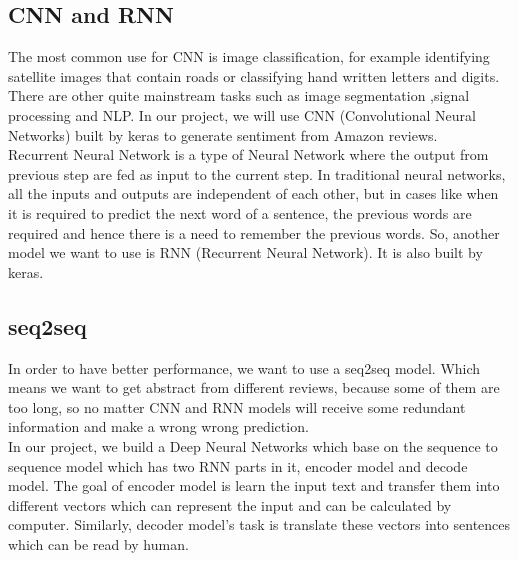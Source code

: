 \documentclass{article}
\begin{document}
\subsection{CNN and RNN}
The most common use for CNN is image classification, for example identifying satellite images that contain roads or classifying hand written letters and digits. There are other quite mainstream tasks such as image segmentation ,signal processing and NLP. In our project, we will use CNN (Convolutional Neural Networks) built by keras to generate sentiment from Amazon reviews.\\[2]
Recurrent Neural Network is a type of Neural Network where the output from previous step are fed as input to the current step. In traditional neural networks, all the inputs and outputs are independent of each other, but in cases like when it is required to predict the next word of a sentence, the previous words are required and hence there is a need to remember the previous words. So, another model we want to use is RNN (Recurrent Neural Network). It is also built by keras.

\subsection{seq2seq}
In order to have better performance, we want to use a seq2seq model. Which means we want to get abstract from different reviews, because some of them  are too long, so no matter CNN and RNN models will receive some redundant information and make a wrong wrong prediction.\\[2]
In our project, we build a Deep Neural Networks which base on the sequence to sequence model which has two RNN parts in it, encoder model and decode model. The goal of encoder model is learn the input text and transfer them into different vectors which can represent the input and can be calculated by computer. Similarly, decoder model's task is translate these vectors into sentences which can be read by human.
\end{document}
